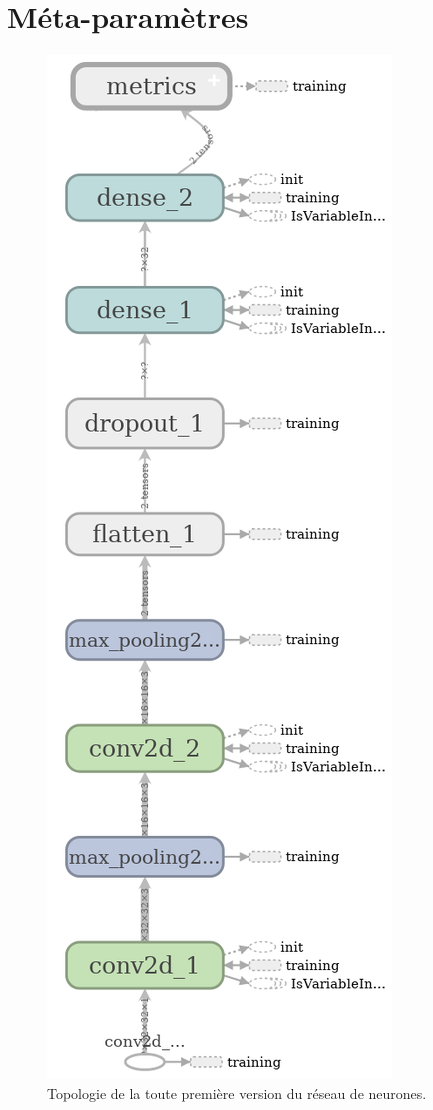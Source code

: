 \documentclass[a4paper, 11pt]{report}
\begin{document}
\section{Méta-paramètres}

\begin{figure}
	\centering
	\includegraphics[height=0.7\textheight]{img/net1.png}
	\caption{Topologie de la toute première version du réseau de neurones.}
	\label{net1}
\end{figure}
\end{document}
